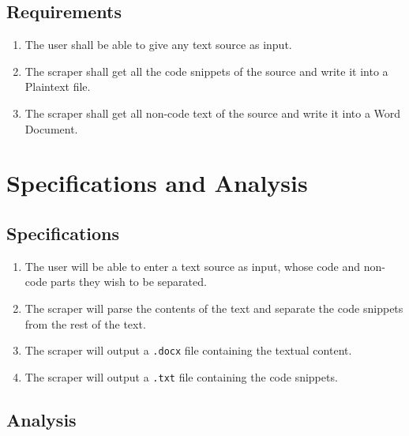 \documentclass{scrreprt}
\newcommand{\ttt}[1]{\texttt{#1}}
\begin{document}
\section{Requirements}

\begin{enumerate}
    \item The user shall be able to give any text source as input.
    \item The scraper shall get all the code snippets of the source and write it into a Plaintext file.
    \item The scraper shall get all non-code text of the source and write it into a Word Document.
\end{enumerate}





\chapter{Specifications and Analysis}


\section{Specifications}

\begin{enumerate}
    \item The user will be able to enter a text source as input, whose code and non-code parts they wish to be separated.
    \item The scraper will parse the contents of the text and separate the code snippets from the rest of the text.
    \item The scraper will output a \texttt{.docx} file containing the textual content.
    \item The scraper will output a \ttt{.txt} file containing the code snippets.  
\end{enumerate}



\section{Analysis}
\end{document}
